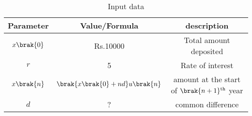 \begin{table}[h]
\renewcommand\thetable{1}
    \centering
    \begin{tabular}{|c|c|c|}
        \hline
        \textbf{Parameter} & \textbf{Value/Formula} & \textbf{description}\\
        \hline
        $x\brak{0}$ & Rs.10000 & Total amount deposited \\
        \hline
        $r$ & 5 & Rate of interest\\
        \hline
        $x\brak{n}$ & $\brak{x\brak{0} + nd}u\brak{n}$ & amount at the start of $\brak{n+1}\textsuperscript{th}$ year\\
        \hline
        $d$ & ? & common difference \\
        \hline
    \end{tabular}
    \caption{Input data}
    \label{11.9.5.30_tab:Input data}
\end{table}
